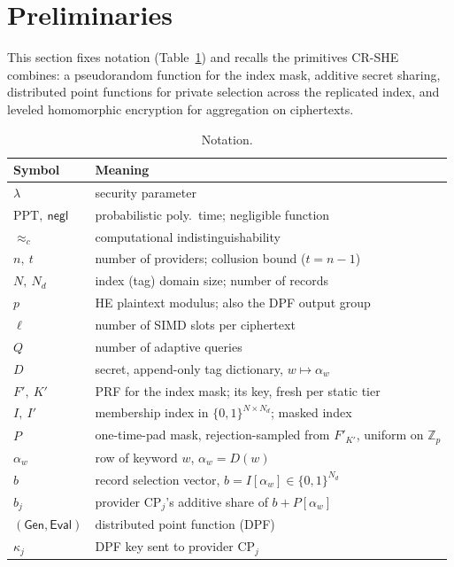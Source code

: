 \documentclass[a4paper,fleqn]{cas-sc}
\newcommand{\negl}{\mathsf{negl}}
\newcommand{\PPT}{\mathrm{PPT}}
\newcommand{\cind}{\approx_c}
\newcommand{\Gen}{\mathsf{Gen}}
\newcommand{\Eval}{\mathsf{Eval}}
\begin{document}
\section{Preliminaries}
\label{sec:prelim}

This section fixes notation (Table~\ref{tab:notation}) and recalls the
primitives CR-SHE combines: a pseudorandom function for the index mask,
additive secret sharing, distributed point functions for private selection
across the replicated index, and leveled homomorphic encryption for
aggregation on ciphertexts.

\begin{table}[pos=htbp]
\caption{Notation.}
\label{tab:notation}
\centering
\footnotesize
\setlength{\tabcolsep}{4pt}
\begin{tabular}{@{}l>{\raggedright\arraybackslash}p{5.5cm}@{}}
\toprule
Symbol & Meaning \\
\midrule
$\lambda$ & security parameter \\
$\PPT,\ \negl$ & probabilistic poly.\ time; negligible function \\
$\cind$ & computational indistinguishability \\
$n,\ t$ & number of providers; collusion bound ($t=n-1$) \\
$N,\ N_d$ & index (tag) domain size; number of records \\
$p$ & HE plaintext modulus; also the DPF output group \\
$\ell$ & number of SIMD slots per ciphertext \\
$Q$ & number of adaptive queries \\
$D$ & secret, append-only tag dictionary, $w\mapsto\alpha_w$ \\
$F',\ K'$ & PRF for the index mask; its key, fresh per static tier \\
$I,\ I'$ & membership index in $\{0,1\}^{N\times N_d}$; masked index \\
$P$ & one-time-pad mask, rejection-sampled from $F'_{K'}$, uniform on
$\mathbb{Z}_p$ \\
$\alpha_w$ & row of keyword $w$, $\alpha_w=D(w)$ \\
$b$ & record selection vector, $b=I[\alpha_w]\in\{0,1\}^{N_d}$ \\
$b_j$ & provider $\text{CP}_j$'s additive share of $b+P[\alpha_w]$ \\
$(\Gen,\Eval)$ & distributed point function (DPF) \\
$\kappa_j$ & DPF key sent to provider $\text{CP}_j$ \\

\end{tabular}
\end{table}
\end{document}

